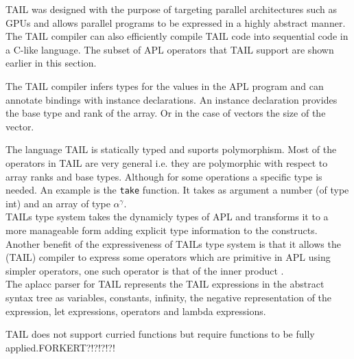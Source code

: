 \documentclass[11pt]{article}
\begin{document}
TAIL was designed with the purpose of targeting parallel architectures such as GPUs and allows parallel programs to be
expressed in a highly abstract manner.
The TAIL compiler can also efficiently compile TAIL code into sequential code in a C-like language.
The subset of APL operators that TAIL support are shown earlier in this section.

The TAIL compiler infers types for the values in the APL program and can annotate bindings with
instance declarations. An instance declaration provides the base type and rank of the array. Or in
the case of vectors the size of the vector.

The language TAIL is statically typed and suports polymorphism. 
Most of the operators in TAIL are very general i.e. they are polymorphic with respect to array ranks and base types.
Although for some operations a specific type is needed.
An example is the {\tt take} function. It takes as argument a number (of type int) and an array of type $\alpha^\gamma$.\\

 TAILs type system takes the dynamicly types of APL and transforms it to a more manageable form adding explicit type
 information to the constructs.
Another benefit of the expressiveness of TAILs type system is that it allows the (TAIL) compiler to express some operators which
are primitive in APL using simpler operators, one such operator is that of the inner product \cite{ElsmanDybdal:Array:2014}. \\

The aplacc parser for TAIL represents the TAIL expressions in the abstract syntax tree as variables, constants, infinity, the negative representation of 
the expression, let expressions, operators and lambda expressions. 

TAIL does not support curried functions but require functions to be fully applied.FORKERT?!?!?!?!\\


\end{document}
